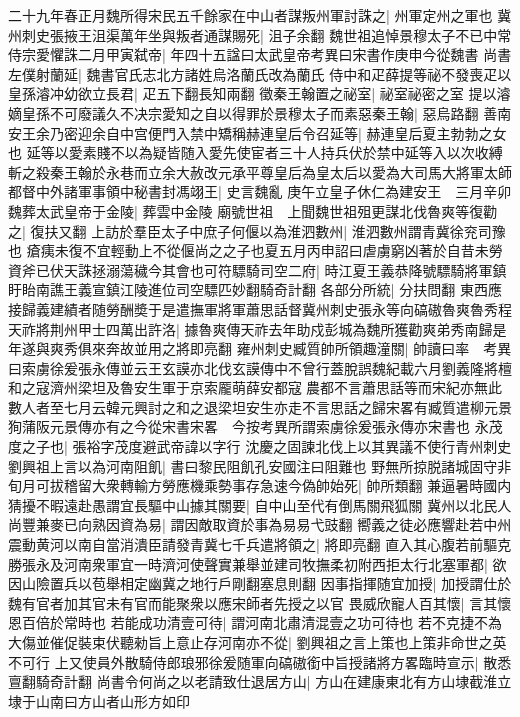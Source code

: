 二十九年春正月魏所得宋民五千餘家在中山者謀叛州軍討誅之|{
	州軍定州之軍也}
冀州刺史張掖王沮渠萬年坐與叛者通謀賜死|{
	沮子余翻}
魏世祖追悼景穆太子不已中常侍宗愛懼誅二月甲寅弑帝|{
	年四十五諡曰太武皇帝考異曰宋書作庚申今從魏書}
尚書左僕射蘭延|{
	魏書官氏志北方諸姓烏洛蘭氏改為蘭氏}
侍中和疋薛提等祕不發喪疋以皇孫濬冲幼欲立長君|{
	疋五下翻長知兩翻}
徵秦王翰置之祕室|{
	祕室祕密之室}
提以濬嫡皇孫不可廢議久不决宗愛知之自以得罪於景穆太子而素惡秦王翰|{
	惡烏路翻}
善南安王余乃密迎余自中宫便門入禁中矯稱赫連皇后令召延等|{
	赫連皇后夏主勃勃之女也}
延等以愛素賤不以為疑皆随入愛先使宦者三十人持兵伏於禁中延等入以次收縛斬之殺秦王翰於永巷而立余大赦改元承平尊皇后為皇太后以愛為大司馬大將軍太師都督中外諸軍事領中秘書封馮翊王|{
	史言魏亂}
庚午立皇子休仁為建安王　三月辛卯魏葬太武皇帝于金陵|{
	葬雲中金陵}
廟號世祖　上聞魏世祖殂更謀北伐魯爽等復勸之|{
	復扶又翻}
上訪於羣臣太子中庶子何偃以為淮泗數州|{
	淮泗數州謂青冀徐兖司豫也}
瘡痍未復不宜輕動上不從偃尚之之子也夏五月丙申詔曰虐虜窮凶著於自昔未勞資斧已伏天誅拯溺蕩穢今其會也可符驃騎司空二府|{
	時江夏王義恭降號驃騎將軍鎮盱眙南譙王義宣鎮江陵進位司空驃匹妙翻騎奇計翻}
各部分所統|{
	分扶問翻}
東西應接歸義建績者随勞酬奬于是遣撫軍將軍蕭思話督冀州刺史張永等向碻磝魯爽魯秀程天祚將荆州甲士四萬出許洛|{
	據魯爽傳天祚去年助戍彭城為魏所獲勸爽弟秀南歸是年遂與爽秀俱來奔故並用之將即亮翻}
雍州刺史臧質帥所領趣潼關|{
	帥讀曰率　考異曰索虜徐爰張永傳並云王玄謨亦北伐玄謨傳中不曾行蓋脫誤魏紀載六月劉義隆將檀和之寇濟州梁坦及魯安生軍于京索龎萌薛安都寇農都不言蕭思話等而宋紀亦無此數人者至七月云韓元興討之和之退梁坦安生亦走不言思話之歸宋畧有臧質遣柳元景狥蒲阪元景傳亦有之今從宋書宋畧　今按考異所謂索虜徐爰張永傳亦宋書也}
永茂度之子也|{
	張裕字茂度避武帝諱以字行}
沈慶之固諫北伐上以其異議不使行青州刺史劉興祖上言以為河南阻飢|{
	書曰黎民阻飢孔安國注曰阻難也}
野無所掠脱諸城固守非旬月可拔稽留大衆轉輸方勞應機乘勢事存急速今偽帥始死|{
	帥所類翻}
兼逼暑時國内猜擾不暇遠赴愚謂宜長驅中山據其關要|{
	自中山至代有倒馬關飛狐關}
冀州以北民人尚豐兼麥已向熟因資為易|{
	謂因敵取資於事為易易弋豉翻}
嚮義之徒必應響赴若中州震動黄河以南自當消潰臣請發青冀七千兵遣將領之|{
	將即亮翻}
直入其心腹若前驅克勝張永及河南衆軍宜一時濟河使聲實兼舉並建司牧撫柔初附西拒太行北塞軍都|{
	欲因山險置兵以苞舉相定幽冀之地行戶剛翻塞息則翻}
因事指揮随宜加授|{
	加授謂仕於魏有官者加其官未有官而能聚衆以應宋師者先授之以官}
畏威欣寵人百其懷|{
	言其懷恩百倍於常時也}
若能成功清壹可待|{
	謂河南北肅清混壹之功可待也}
若不克捷不為大傷並催促裝束伏聽勑旨上意止存河南亦不從|{
	劉興祖之言上策也上策非命世之英不可行}
上又使員外散騎侍郎琅邪徐爰随軍向碻磝銜中旨授諸將方畧臨時宣示|{
	散悉亶翻騎奇計翻}
尚書令何尚之以老請致仕退居方山|{
	方山在建康東北有方山埭截淮立埭于山南曰方山者山形方如印}
